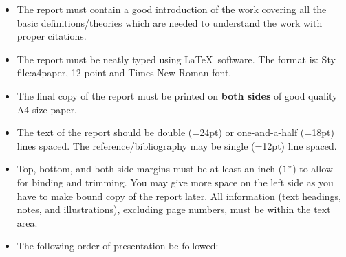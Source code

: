 \documentclass[12pt, a4paper]{article}
\begin{document}
\begin{itemize}
\item{The report must contain a good introduction of the work covering all the basic
     definitions/theories  which are needed to understand the work with proper citations.}
\item{The report must be neatly typed using \LaTeX ~software.  The format is:
     Sty file:a4paper, 12 point and Times New Roman font.}
\item{The final copy of the report must be printed on {\bf both sides} of good quality A4 size paper.}
\item{ The text of the report should be  double (=24pt) or one-and-a-half (=18pt) lines spaced.
     The reference/bibliography may be single (=12pt) line spaced. }
\item Top, bottom, and both side margins must be at least an inch ($1"$)
  to allow for binding and trimming. You may give more space on the left side as you have
  to make bound copy of the report later.  All information (text headings, notes,
  and illustrations), excluding page numbers, must be within the text
  area.
\item{The following order of presentation be followed:

}
\end{itemize}
\end{document}
